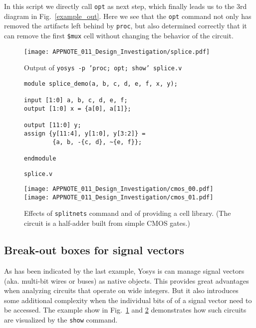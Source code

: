 \documentclass[9pt,technote,a4paper]{IEEEtran}
\begin{document}
\medskip

In this script we directly call {\tt opt} as next step, which finally leads us to
the 3rd diagram in Fig.~\ref{example_out}. Here we see that the {\tt opt} command
not only has removed the artifacts left behind by {\tt proc}, but also determined
correctly that it can remove the first {\tt \$mux} cell without changing the behavior
of the circuit.

\begin{figure}[b!]
\texttt{[image: APPNOTE\_011\_Design\_Investigation/splice.pdf]}
\caption{Output of {\tt yosys -p 'proc; opt; show' splice.v}}
\label{splice_dia}
\end{figure}

\begin{figure}[b!]
\begin{lstlisting}
module splice_demo(a, b, c, d, e, f, x, y);

input [1:0] a, b, c, d, e, f;
output [1:0] x = {a[0], a[1]};

output [11:0] y;
assign {y[11:4], y[1:0], y[3:2]} =
		{a, b, -{c, d}, ~{e, f}};

endmodule
\end{lstlisting}
\caption{\tt splice.v}
\label{splice_src}
\end{figure}

\begin{figure}[t!]
\texttt{[image: APPNOTE\_011\_Design\_Investigation/cmos\_00.pdf]}
\texttt{[image: APPNOTE\_011\_Design\_Investigation/cmos\_01.pdf]}
\caption{Effects of {\tt splitnets} command and of providing a cell library. (The
circuit is a half-adder built from simple CMOS gates.)}
\label{splitnets_libfile}
\end{figure}

\subsection{Break-out boxes for signal vectors}

As has been indicated by the last example, Yosys is can manage signal vectors (aka.
multi-bit wires or buses) as native objects. This provides great advantages
when analyzing circuits that operate on wide integers. But it also introduces
some additional complexity when the individual bits of of a signal vector need
to be accessed. The example show in Fig.~\ref{splice_dia} and \ref{splice_src}
demonstrates how such circuits are visualized by the {\tt show} command.
\end{document}
